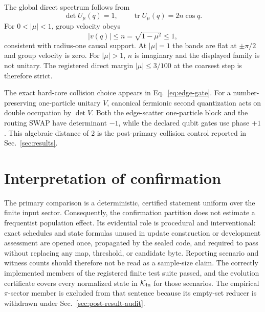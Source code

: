 The global direct spectrum follows from
\begin{equation}
 \det U_\mu(q)=1,\qquad \operatorname{tr}U_\mu(q)=2n\cos q.
\end{equation}
For $0<|\mu|<1$, group velocity obeys
\begin{equation}
 |v(q)|\le n=\sqrt{1-\mu^2}\le1,
\end{equation}
consistent with radius-one causal support.  At $|\mu|=1$ the bands are flat at
$\pm\pi/2$ and group velocity is zero.  For $|\mu|>1$, $n$ is imaginary and
the displayed family is not unitary.  The registered direct margin
$|\mu|\le3/100$ at the coarsest step is therefore strict.

The exact hard-core collision choice appears in Eq.~\eqref{eq:edge-gate}.  For a
number-preserving one-particle unitary $V$, canonical fermionic second
quantization acts on double occupation by $\det V$.  Both the edge-scatter
one-particle block and the routing SWAP have determinant $-1$, while the
declared qubit gates use phase $+1$.  This algebraic distance of $2$ is the
post-primary collision control reported in Sec.~\ref{sec:results}.

\section{Interpretation of confirmation}

The primary comparison is a deterministic, certified statement uniform over
the finite input sector.  Consequently, the confirmation partition does not
estimate a frequentist population effect.  Its evidential role is procedural
and interventional: exact schedules and state formulas unused in update
construction or development assessment are opened once, propagated by the sealed code, and required to
pass without replacing any map, threshold, or candidate byte.  Reporting
scenario and witness counts should therefore not be read as a sample-size
claim.  The correctly implemented members of the registered finite test suite
passed, and the evolution certificate covers every normalized state in $\mathcal{K}_{\mathrm{in}}$
for those scenarios.  The empirical $\pi$-sector member is excluded from that
sentence because its empty-set reducer is withdrawn under
Sec.~\ref{sec:post-result-audit}.
